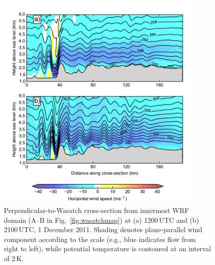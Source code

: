 \documentclass[pdftex,12pt]{article}
\begin{document}
\begin{figure}[t]
   \centering
\includegraphics[width=0.9\textwidth]{yes_xs_westeast_parawind.pdf}
   \caption{Perpendicular-to-Wasatch cross-section from innermost WRF domain (A--B in Fig.~\ref{fig:wasatchmap}) at (a) 1200\,UTC and (b) 2100\,UTC, 1 December 2011. Shading denotes plane-parallel wind component according to the scale (e.g., blue indicates flow from right to left), while potential temperature is contoured at an interval of 2\,K.}
   \label{fig:ppxswu}
\end{figure}
\end{document}
